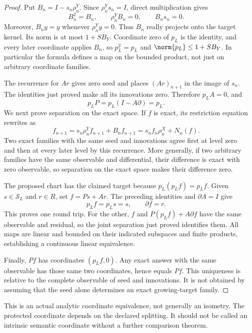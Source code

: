 \begin{proof}
Put \(B_n=I-s_n\rho^Y_n\). Since \(\rho^Y_ns_n=I\), direct multiplication gives
\[
 B_n^2=B_n,\qquad \rho^Y_nB_n=0,\qquad B_ns_n=0.
\]
Moreover, \(B_ny=y\) whenever \(\rho^Y_ny=0\). Thus \(B_n\) really projects onto the target kernel. Its norm is at most \(1+SB_Y\). Coordinate zero of \(p_L\) is the identity, and every later coordinate applies \(B_n\), so \(p_L^2=p_L\) and \(\norm{p_L}\le1+SB_Y\). In particular the formula defines a map on the bounded product, not just on arbitrary coordinate families.

The recurrence for \(Ar\) gives zero seed and places \((Ar)_{n+1}\) in the image of \(s_n\). The identities just proved make all its innovations zero. Therefore \(p_LA=0\), and
\[
 p_LP=p_L(I-A\partial)=p_L.
\]
We next prove separation on the exact space. If \(f\) is exact, its restriction equation rewrites as
\[
 f_{n+1}=s_n\rho^Y_nf_{n+1}+B_nf_{n+1}
          =s_nf_n\rho^X_n+N_n(f).
\]
Two exact families with the same seed and innovations agree first at level zero and then at every later level by this recurrence. More generally, if two arbitrary families have the same observable and differential, their difference is exact with zero observable, so separation on the exact space makes their difference zero.

The proposed chart has the claimed target because \(p_L(p_Lf)=p_Lf\). Given \(s\in\mathcal S_L\) and \(r\in R\), set \(f=Ps+Ar\). The preceding identities and \(\partial A=I\) give
\[
 p_Lf=p_Ls=s,\qquad \partial f=r.
\]
This proves one round trip. For the other, \(f\) and \(P(p_Lf)+A\partial f\) have the same observable and residual, so the joint separation just proved identifies them. All maps are linear and bounded on their indicated subspaces and finite products, establishing a continuous linear equivalence.

Finally, \(Pf\) has coordinates \((p_Lf,0)\). Any exact answer with the same observable has those same two coordinates, hence equals \(Pf\). This uniqueness is relative to the complete observable of seed and innovations. It is not obtained by assuming that the seed alone determines an exact growing-target family.
\end{proof}
This is an actual analytic coordinate equivalence, not generally an isometry. The protected coordinate depends on the declared splitting. It should not be called an intrinsic semantic coordinate without a further comparison theorem.


